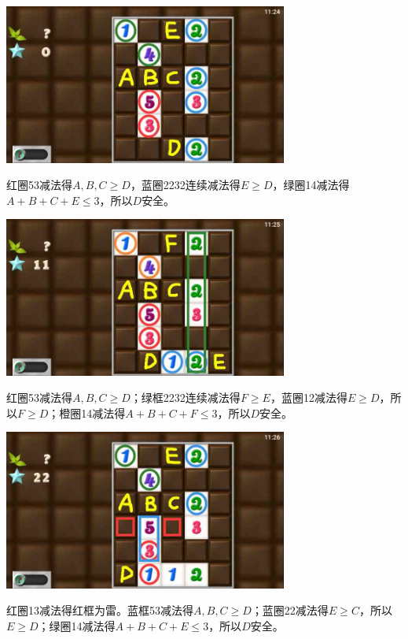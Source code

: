 \subsection{} %
\begin{center}
    \includegraphics[width=0.7\textwidth]{puzzlelow/216-1.jpg}
\end{center}
红圈53减法得$A,B,C\ge D$，蓝圈2232连续减法得$E\ge D$，绿圈14减法得$A+B+C+E\le 3$，所以$D$安全。
\begin{center}
    \includegraphics[width=0.7\textwidth]{puzzlelow/216-2.jpg}
\end{center}
红圈53减法得$A,B,C\ge D$；绿框2232连续减法得$F\ge E$，蓝圈12减法得$E\ge D$，所以$F\ge D$；橙圈14减法得$A+B+C+F\le 3$，所以$D$安全。
\begin{center}
    \includegraphics[width=0.7\textwidth]{puzzlelow/216-3.jpg}
\end{center}
红圈13减法得红框为雷。蓝框53减法得$A,B,C\ge D$；蓝圈22减法得$E\ge C$，所以$E\ge D$；绿圈14减法得$A+B+C+E\le 3$，所以$D$安全。

